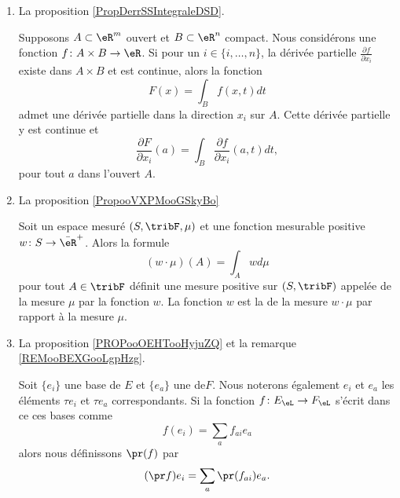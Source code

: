 \begin{enumerate}
    \item
        La proposition \ref{PropDerrSSIntegraleDSD}.
        \begin{proposition}
    Supposons $A\subset\eR^m$ ouvert et $B\subset\eR^n$ compact. Nous considérons une fonction \( f\colon A\times B\to \eR\). Si pour un $i\in\{ i,\ldots,n \}$, la dérivée partielle $\frac{ \partial f }{ \partial x_i }$ existe dans $A\times B$ et est continue, alors la fonction
    \begin{equation}
        F(x)=\int_Bf(x,t)dt
    \end{equation}
    admet une dérivée partielle dans la direction \( x_i\) sur \( A\). Cette dérivée partielle y est continue et
    \begin{equation}
        \frac{ \partial F }{ \partial x_i }(a)=\int_B\frac{ \partial f }{ \partial x_i }(a,t)dt,
    \end{equation}
    pour tout \( a\) dans l'ouvert \( A\).
\end{proposition}
        \item
            La proposition \ref{PropooVXPMooGSkyBo}
            \begin{proposition}
    Soit un espace mesuré \( (S,\tribF,\mu)\) et une fonction mesurable positive \( w\colon S\to \bar\eR^+\). Alors la formule
    \begin{equation}
        (w\cdot \mu)(A)=\int_Awd\mu
    \end{equation}
    pour tout \( A\in \tribF\) définit une mesure positive sur \( (S,\tribF)\) appelée  de la mesure \( \mu\) par la fonction \( w\). La fonction \( w\) est la  de la mesure \( w\cdot \mu\) par rapport à la mesure \( \mu\).
            \end{proposition}
        \item
            La proposition \ref{PROPooOEHTooHyjuZQ} et la remarque \ref{REMooBEXGooLgpHzg}.

Soit \( \{ e_i \}\) une base de \( E \) et \(\{ e_a \}\) une  de\( F\). Nous noterons également \( e_i\) et \( e_a\) les éléments \( \tau e_i\) et \( \tau e_a\) correspondants. Si la fonction \( f\colon E_{\eL}\to F_{\eL}\) s'écrit dans ce ces bases comme
\begin{equation}
    f(e_i)=\sum_af_{ai}e_a
\end{equation}
alors nous définissons \( \pr(f)\) par 
\begin{equation}        \label{EQooUWJLooTsbGZj}
    (\pr f)e_i=\sum_a\pr(f_{ai})e_a.
\end{equation}


\end{enumerate}
